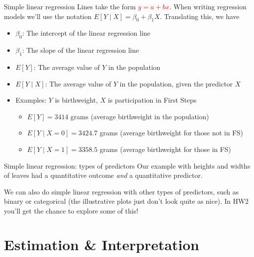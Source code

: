 \documentclass[10pt,t]{beamer}
\begin{document}
\begin{frame}{Simple linear regression}
Lines take the form \textcolor{red}{$y = a + bx$}. When writing regression models we'll use the notation $E[Y \mid X] = \beta_0 + \beta_1 X$. Translating this, we have

\vspace{0.3cm}

\begin{itemize}
	\item $\beta_0$: The intercept of the linear regression line
	\item $\beta_1$: The slope of the linear regression line
	\item $E[Y]$: The average value of $Y$ in the population
	\item $E[Y \mid X]$: The average value of $Y$ in the population, given the predictor $X$
	\item Examples: $Y$ is birthweight, $X$ is participation in First Steps
	\begin{itemize}
		\item $E[Y] = 3414$ grams (average birthweight in the population)
		\item $E[Y \mid X = 0] = 3424.7$ grams (average birthweight for those not in FS)
		\item $E[Y \mid X = 1] = 3358.5$ grams (average birthweight for those in FS)
	\end{itemize}
\end{itemize}
\end{frame}

\begin{frame}{Simple linear regression: types of predictors}
Our example with heights and widths of leaves had a quantitative outcome \textit{and} a quantitative predictor. 

\vspace{0.3cm}

We can also do simple linear regression with other types of predictors, such as binary or categorical (the illustrative plots just don't look quite as nice). In HW2 you'll get the chance to explore some of this!
\end{frame}

\section{Estimation \& Interpretation}
\end{document}

